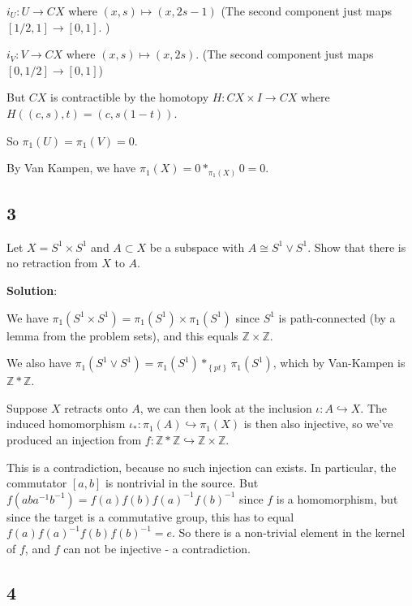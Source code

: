 \(i_U: U \to CX\) where \((x,s) \mapsto (x, 2s-1)\) (The second
component just maps \([1/2, 1] \to[0,1]\). )

\(i_V: V \to CX\) where \((x, s) \mapsto (x, 2s)\). (The second
component just maps \([0,1/2] \to [0, 1]\))

But \(CX\) is contractible by the homotopy \(H:CX \times I \to CX\)
where \(H((c,s), t) = (c, s(1-t))\).

So \(\pi_1(U) = \pi_1(V) = 0\).

By Van Kampen, we have \(\pi_1(X) = 0 \ast_{\pi_1(X)} 0 = 0.\)

\hypertarget{section-16}{%
\subsection{3}\label{section-16}}

Let \(X = S^1 \times S^1\) and \(A\subset X\) be a subspace with
\(A \cong S^1 \vee S^1\). Show that there is no retraction from \(X\) to
\(A\).

\textbf{Solution}:

We have \(\pi_1(S^1 \times S^1) = \pi_1(S^1) \times\pi_1(S^1)\) since
\(S^1\) is path-connected (by a lemma from the problem sets), and this
equals \({\mathbb{Z}}\times{\mathbb{Z}}\).

We also have
\(\pi_1(S^1 \vee S^1) = \pi_1(S^1) \ast_{\left\{{pt}\right\}} \pi_1(S^1)\),
which by Van-Kampen is \({\mathbb{Z}}\ast {\mathbb{Z}}\).

Suppose \(X\) retracts onto \(A\), we can then look at the inclusion
\(\iota: A \hookrightarrow X\). The induced homomorphism
\(\iota_*: \pi_1(A) \hookrightarrow\pi_1(X)\) is then also injective, so
we've produced an injection from
\(f: {\mathbb{Z}}\ast {\mathbb{Z}}\hookrightarrow{\mathbb{Z}}\times{\mathbb{Z}}\).

This is a contradiction, because no such injection can exists. In
particular, the commutator \([a,b]\) is nontrivial in the source. But
\(f(aba^{-1}b^{-1}) = f(a)f(b)f(a)^{-1}f(b)^{-1}\) since \(f\) is a
homomorphism, but since the target is a commutative group, this has to
equal \(f(a)f(a)^{-1} f(b)f(b)^{-1} = e\). So there is a non-trivial
element in the kernel of \(f\), and \(f\) can not be injective - a
contradiction.

\hypertarget{section-17}{%
\subsection{4}\label{section-17}}

